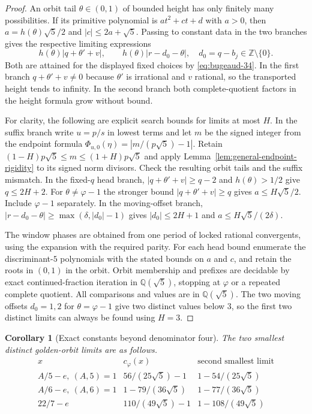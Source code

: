 \documentclass[11pt]{amsart}
\newtheorem{corollary}[theorem]{Corollary}
\theoremstyle{definition}
\theoremstyle{remark}
\numberwithin{equation}{section}
\newcommand{\Q}{\mathbb{Q}}
\newcommand{\Z}{\mathbb{Z}}
\begin{document}
\begin{proof}
An orbit tail $\theta\in(0,1)$ of bounded height has only finitely
many possibilities. If its primitive polynomial is
$a t^2+ct+d$ with $a>0$, then $a=h(\theta)\sqrt5/2$ and
$|c|\le2a+\sqrt5$. Passing to constant data in the two branches
gives the respective limiting expressions
\[
 h(\theta)|q+\theta'+v|,\qquad
 h(\theta)|r-d_0-\theta|,\quad d_0=q-b_j\in\Z\setminus\{0\}.
\]
Both are attained for the displayed fixed choices by
\eqref{eq:bugeaud-34}. In the first branch $q+\theta'+v\ne0$
because $\theta'$ is irrational and $v$ rational, so the transported
height tends to infinity. In the second branch both complete-quotient
factors in the height formula grow without bound.

For clarity, the following are explicit search bounds for limits
at most $H$. In the suffix branch write $u=p/s$ in lowest terms and
let $m$ be the signed integer from the endpoint formula
$\Phi_{u,0}(\eta)=|m/(p\sqrt5)-1|$. Retain
$(1-H)p\sqrt5\le m\le(1+H)p\sqrt5$ and apply
Lemma~\ref{lem:general-endpoint-rigidity} to its signed norm divisors.
Check the resulting orbit tails and the suffix mismatch.
In the fixed-$q$ head branch, $|q+\theta'+v|\ge q-2$ and
$h(\theta)>1/2$ give $q\le 2H+2$. For
$\theta\ne\varphi-1$ the stronger bound $|q+\theta'+v|\ge q$
gives $a\le H\sqrt5/2$. Include $\varphi-1$ separately.
In the moving-offset branch,
$|r-d_0-\theta|\ge\max(\delta,|d_0|-1)$ gives
$|d_0|\le 2H+1$ and $a\le H\sqrt5/(2\delta)$.

The window phases are obtained from one period of locked rational
convergents, using the expansion with the required parity.
For each head bound enumerate the discriminant-$5$ polynomials
with the stated bounds on $a$ and $c$, and retain the roots in
$(0,1)$ in the orbit. Orbit membership and prefixes are decidable by
exact continued-fraction iteration in $\Q(\sqrt5)$, stopping at
$\varphi$ or a repeated complete quotient. All comparisons and
values are in $\Q(\sqrt5)$. The two moving offsets $d_0=1,2$
for $\theta=\varphi-1$ give two distinct values below $3$,
so the first two distinct limits can always be found using $H=3$.
\end{proof}

\begin{corollary}[Exact constants beyond denominator four]
\label{cor:golden-finite-shift-examples}
The two smallest distinct golden-orbit limits are as follows.
\[
\begin{array}{c|cc}
x & c_\varphi(x) & \text{second smallest limit}\\ \hline
A/5-e,\ (A,5)=1 & 56/(25\sqrt5)-1 & 1-54/(25\sqrt5)\\
A/6-e,\ (A,6)=1 & 1-79/(36\sqrt5) & 1-77/(36\sqrt5)\\
22/7-e & 110/(49\sqrt5)-1 & 1-108/(49\sqrt5)
\end{array}
\]
\end{corollary}
\end{document}

